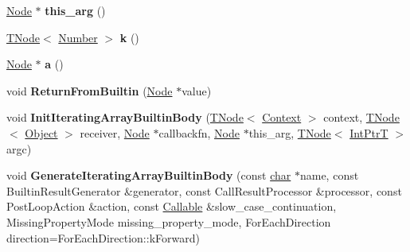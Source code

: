 \begin{DoxyCompactItemize}
\mbox{\label{classv8_1_1internal_1_1ArrayBuiltinsAssembler_a5b13397d52216d1bffb296c6a11c123a}} 
\mbox{\hyperlink{classv8_1_1internal_1_1compiler_1_1Node}{Node}} $\ast$ {\bfseries this\+\_\+arg} ()
\item 
\mbox{\label{classv8_1_1internal_1_1ArrayBuiltinsAssembler_af48f80c0b9e76c497fe59c1c5a5d77bd}} 
\mbox{\hyperlink{classv8_1_1internal_1_1compiler_1_1TNode}{T\+Node}}$<$ \mbox{\hyperlink{structv8_1_1internal_1_1UnionT}{Number}} $>$ {\bfseries k} ()
\item 
\mbox{\label{classv8_1_1internal_1_1ArrayBuiltinsAssembler_af5645c9e02c734202949499077dca5ff}} 
\mbox{\hyperlink{classv8_1_1internal_1_1compiler_1_1Node}{Node}} $\ast$ {\bfseries a} ()
\item 
\mbox{\label{classv8_1_1internal_1_1ArrayBuiltinsAssembler_a23fca371af03b950aa276a6c3451fcc5}} 
void {\bfseries Return\+From\+Builtin} (\mbox{\hyperlink{classv8_1_1internal_1_1compiler_1_1Node}{Node}} $\ast$value)
\item 
\mbox{\label{classv8_1_1internal_1_1ArrayBuiltinsAssembler_af05791759f2eea8476014f0eaec8058e}} 
void {\bfseries Init\+Iterating\+Array\+Builtin\+Body} (\mbox{\hyperlink{classv8_1_1internal_1_1compiler_1_1TNode}{T\+Node}}$<$ \mbox{\hyperlink{classv8_1_1internal_1_1Context}{Context}} $>$ context, \mbox{\hyperlink{classv8_1_1internal_1_1compiler_1_1TNode}{T\+Node}}$<$ \mbox{\hyperlink{classv8_1_1internal_1_1Object}{Object}} $>$ receiver, \mbox{\hyperlink{classv8_1_1internal_1_1compiler_1_1Node}{Node}} $\ast$callbackfn, \mbox{\hyperlink{classv8_1_1internal_1_1compiler_1_1Node}{Node}} $\ast$this\+\_\+arg, \mbox{\hyperlink{classv8_1_1internal_1_1compiler_1_1TNode}{T\+Node}}$<$ \mbox{\hyperlink{structv8_1_1internal_1_1IntPtrT}{Int\+PtrT}} $>$ argc)
\item 
\mbox{\label{classv8_1_1internal_1_1ArrayBuiltinsAssembler_a0ef3e0d6f07615bb630c102fc94a2452}} 
void {\bfseries Generate\+Iterating\+Array\+Builtin\+Body} (const \mbox{\hyperlink{classchar}{char}} $\ast$name, const Builtin\+Result\+Generator \&generator, const Call\+Result\+Processor \&processor, const Post\+Loop\+Action \&action, const \mbox{\hyperlink{classv8_1_1internal_1_1Callable}{Callable}} \&slow\+\_\+case\+\_\+continuation, Missing\+Property\+Mode missing\+\_\+property\+\_\+mode, For\+Each\+Direction direction=For\+Each\+Direction\+::k\+Forward)

\end{DoxyCompactItemize}
